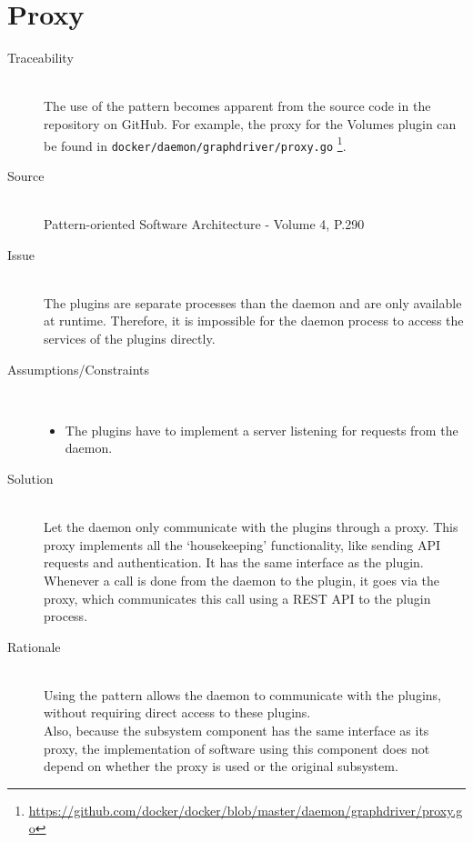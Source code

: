 \section{Proxy}
\begin{description}

\item [Traceability]~\\
The use of the  pattern becomes apparent from the source code in the repository on GitHub.
For example, the proxy for the Volumes plugin can be found in \verb|docker/daemon/graphdriver/proxy.go| \footnote{\url{https://github.com/docker/docker/blob/master/daemon/graphdriver/proxy.go}}.

\item [Source]~\\
Pattern-oriented Software Architecture - Volume 4, P.290 \cite{wiley4}

\item [Issue]~\\
The plugins are separate processes than the daemon and are only available at runtime. Therefore, it is impossible for the daemon process to access the services of the plugins directly.

\item [Assumptions/Constraints]~
\begin{itemize}
\item The plugins have to implement a server listening for requests from the daemon.
\end{itemize}

\item [Solution]~\\
Let the daemon only communicate with the plugins through a proxy. This proxy implements all the `housekeeping' functionality, like sending API requests and authentication. It has the same interface as the plugin. \\
Whenever a call is done from the daemon to the plugin, it goes via the proxy, which communicates this call using a REST API to the plugin process.

\item [Rationale] ~\\ 
Using the  pattern allows the daemon to communicate with the plugins, without requiring direct access to these plugins. \\
Also, because the subsystem component has the same interface as its proxy, the implementation of software using this component does not depend on whether the proxy is used or the original subsystem. 


\end{description}
